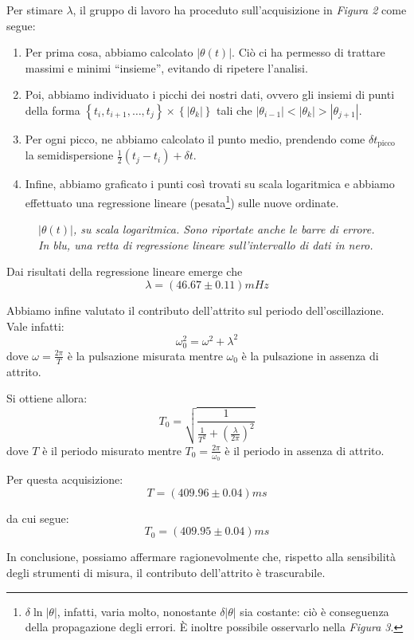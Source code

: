 \documentclass{article}
\begin{document}
Per stimare $\lambda$, il gruppo di lavoro ha proceduto
sull'acquisizione in \emph{Figura 2} come segue:
\begin{enumerate}
    \item
        Per prima cosa, abbiamo calcolato $\left|\theta(t)\right|$.
        Ciò ci ha permesso di trattare massimi e minimi “insieme”,
        evitando di ripetere l'analisi.
    \item
        Poi, abbiamo individuato i picchi dei nostri dati, ovvero
        gli insiemi di punti della forma
        $\left\{t_i,t_{i+1},\dots,t_j\right\}\times\left\{\left|\theta_k\right|\right\}$
        tali che $\left|\theta_{i-1}\right| < \left|\theta_k\right| > \left|\theta_{j+1}\right|$.
    \item
        Per ogni picco, ne abbiamo calcolato il punto medio,
        prendendo come $\delta t_\text{picco}$ la semidispersione $\frac{1}{2}(t_j - t_i) + \delta t$.
    \item
        Infine, abbiamo graficato i punti così trovati
        su scala logaritmica e
        abbiamo effettuato una regressione lineare (pesata\footnote{
            $\delta\!\ln{\left|\theta\right|}$, infatti, varia molto,
            nonostante $\delta\!\left|\theta\right|$ sia costante:
            ciò è conseguenza della propagazione degli errori.
            È inoltre possibile osservarlo nella \emph{Figura 3}.
        })
        sulle nuove ordinate.
\end{enumerate}

\begin{center}
    \begin{figure}[H]
        \caption[]{\emph{
            $\left|\theta(t)\right|$, su scala logaritmica.
            Sono riportate anche le barre di errore.
            In blu, una retta di regressione lineare
            sull'intervallo di dati in nero.
        }}
    \end{figure}
\end{center}

Dai risultati della regressione lineare emerge che
\[\lambda = \left(46.67\pm0.11\right)\unit{mHz}\]

Abbiamo infine valutato il contributo dell'attrito sul periodo
dell'oscillazione. Vale infatti:
\[\omega_0^2 = \omega^2 + \lambda^2\]
dove $\omega=\frac{2\pi}{T}$ è la pulsazione misurata
mentre $\omega_0$ è la pulsazione in assenza di attrito.

Si ottiene allora:
\[T_0 = \sqrt{\frac{1}{\frac{1}{T^2} + \left(\frac{\lambda}{2\pi}\right)^2}}\]
dove $T$ è il periodo misurato mentre
$T_0=\frac{2\pi}{\omega_0}$ è il periodo in assenza di attrito.

Per questa acquisizione:
\[T = \left(409.96\pm0.04\right)\unit{ms}\]

da cui segue:
\[T_0=\left(409.95\pm0.04\right)\unit{ms}\]

In conclusione, possiamo affermare ragionevolmente che,
rispetto alla sensibilità degli strumenti di misura,
il contributo dell'attrito è trascurabile.
\end{document}

